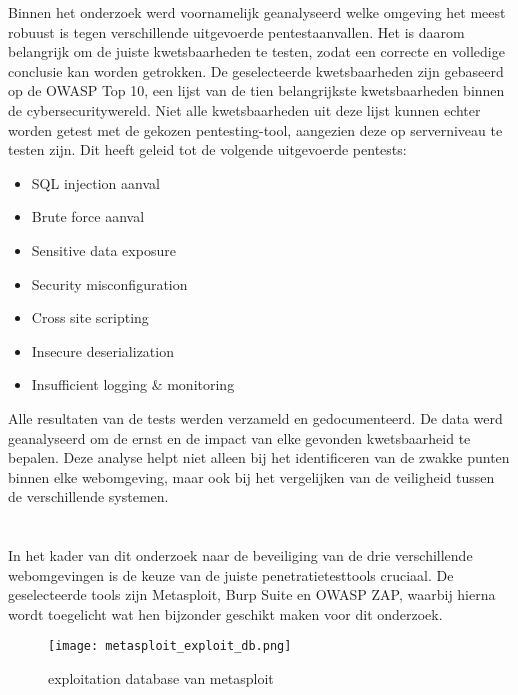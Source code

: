 Binnen het onderzoek werd voornamelijk geanalyseerd welke omgeving het meest robuust is tegen verschillende uitgevoerde pentestaanvallen. 
Het is daarom belangrijk om de juiste kwetsbaarheden te testen, zodat een correcte en volledige conclusie kan worden 
getrokken. De geselecteerde kwetsbaarheden zijn gebaseerd op de OWASP Top 10, een lijst van de tien belangrijkste 
kwetsbaarheden binnen de cybersecuritywereld. Niet alle kwetsbaarheden uit deze lijst kunnen echter worden getest met de 
gekozen pentesting-tool, aangezien deze op serverniveau te testen zijn. Dit heeft geleid tot de volgende uitgevoerde pentests:

\begin{itemize}
    \item SQL injection aanval
    \item Brute force aanval
    \item Sensitive data exposure
    \item Security misconfiguration
    \item Cross site scripting
    \item Insecure deserialization
    \item Insufficient logging \& monitoring 
\end{itemize}

Alle resultaten van de tests werden verzameld en gedocumenteerd. De data werd geanalyseerd 
om de ernst en de impact van elke gevonden kwetsbaarheid te bepalen. Deze analyse helpt niet alleen bij 
het identificeren van de zwakke punten binnen elke webomgeving, maar ook bij het vergelijken van de 
veiligheid tussen de verschillende systemen.

\section{}
In het kader van dit onderzoek naar de beveiliging van de drie verschillende webomgevingen is de keuze van 
de juiste penetratietesttools cruciaal. De geselecteerde tools zijn 
Metasploit, Burp Suite en OWASP ZAP, waarbij hierna wordt toegelicht wat hen bijzonder geschikt maken voor dit onderzoek.
\begin{figure}
    \centering
    \texttt{[image: metasploit\_exploit\_db.png]}
    \caption[exploitation database van metasploit]{exploitation database van metasploit}
    \label{fig:exploitatie_db}
\end{figure}
